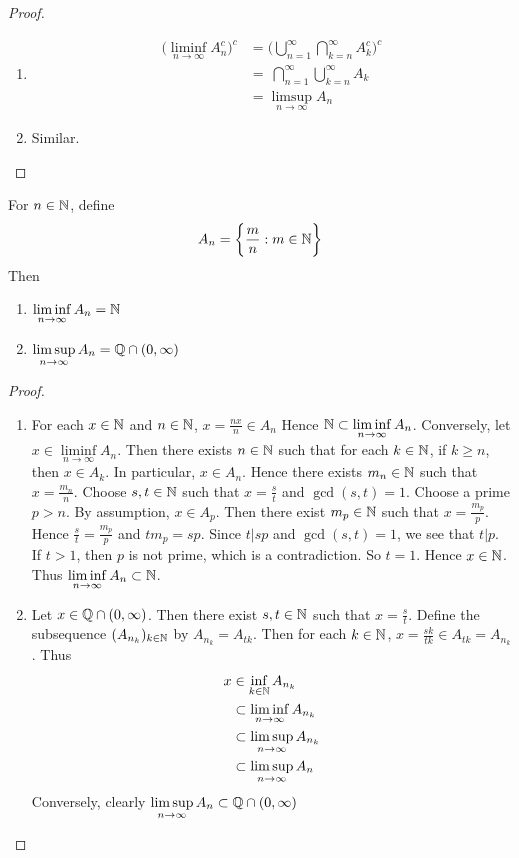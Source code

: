 \documentclass{book}
\begin{document}
	\begin{proof}\
		\begin{enumerate}
			\item \begin{align*}
				\bigg( \liminf\limits_{n \rightarrow \infty}A_n^c \bigg)^c 
				&= \bigg( \bigcup\limits_{n=1}^{\infty} \bigcap\limits_{k=n}^{\infty}A_k^c \bigg)^c\\
				&= \ \bigcap\limits_{n=1}^{\infty}\bigcup\limits_{k=n}^{\infty}A_k  \\
				&=  \limsup\limits_{n \rightarrow \infty}A_n
			\end{align*}
			\item Similar.
		\end{enumerate}
	\end{proof}
	
	\begin{ex}  
		For $n \in \mathbb{N}$, define $$A_n = \bigg\{ \frac{m}{n}: m \in \mathbb{N} \bigg\}$$ 
		Then
		\begin{enumerate}
			\item $\liminf\limits_{n \rightarrow \infty }A_n = \mathbb{N}$ 
			\item $\limsup\limits_{n \rightarrow \infty }A_n = \mathbb{Q} \cap (0,\infty )$
		\end{enumerate}
	\end{ex}
	
	\begin{proof}\
		\begin{enumerate}
			\item For each $x \in \mathbb{N}$ and $n \in \mathbb{N}$, $x = \frac{nx}{n} \in A_n$ Hence $\mathbb{N} \subset \liminf\limits_{n \rightarrow \infty }A_n$. Conversely, let $x \in \liminf\limits_{n \rightarrow \infty }A_n$. Then there exists $n \in \mathbb{N}$ such that for each $k \in \mathbb{N}$, if $k \geq n$, then $x \in A_k$. In particular, $x \in A_n$. Hence there exists $m_n \in \mathbb{N}$ such that $x = \frac{m_n}{n}$. Choose $s,t \in \mathbb{N}$ such that $x= \frac{s}{t}$ and $\gcd(s,t) = 1$. Choose a prime $p > n$. By assumption, $x \in A_p$. Then there exist $m_p \in \mathbb{N}$ such that $x = \frac{m_p}{p}$. Hence $\frac{s}{t} = \frac{m_p}{p}$ and $tm_p = sp$. Since $t | sp$ and $\gcd(s,t) = 1$, we see that $t | p$. If $t > 1$, then $p$ is not prime, which is a contradiction. So $t = 1$. Hence $x \in \mathbb{N}$. Thus $\liminf\limits_{n \rightarrow \infty }A_n \subset \mathbb{N}$. 
			\item Let $x \in \mathbb{Q} \cap (0, \infty)$. Then there exist $s,t \in \mathbb{N}$ such that $x = \frac{s}{t}$. Define the subsequence $(A_{n_k})_{k \in \mathbb{N}}$ by $A_{n_k} = A_{tk}$. Then for each $k \in \mathbb{N}$, $x = \frac{sk}{tk} \in A_{tk} = A_{n_k}$. Thus
			\begin{align*}
				x 
				&\in \inf_{k \in \mathbb{N}} A_{n_k} \\
				& \subset \liminf_{n \rightarrow \infty} A_{n_k} \\
				& \subset \limsup_{n \rightarrow \infty} A_{n_k} \\
				& \subset \limsup\limits_{n \rightarrow \infty } A_n
			\end{align*} 
			Conversely, clearly $\limsup\limits_{n \rightarrow \infty }A_n \subset \mathbb{Q} \cap (0, \infty)$ 
		\end{enumerate}
	\end{proof}
	
\end{document}
